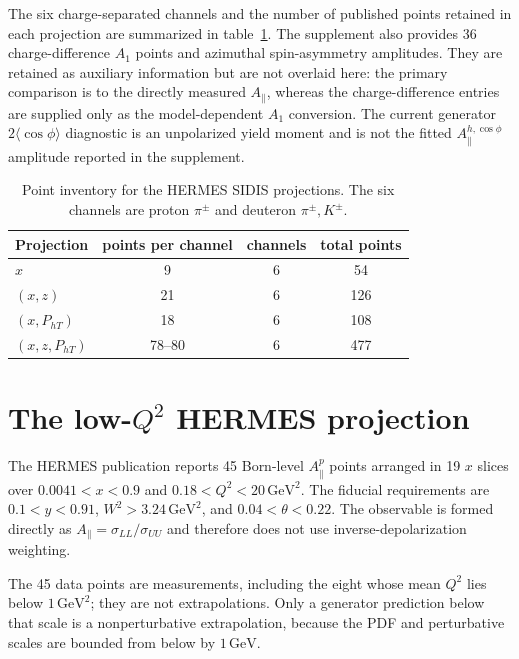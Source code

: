\documentclass[11pt,a4paper]{article}
\newcommand{\ap}{A_{\parallel}}
\newcommand{\suu}{\sigma_{UU}}
\newcommand{\sll}{\sigma_{LL}}
\newcommand{\GeV}{\ensuremath{\,\mathrm{GeV}}}
\begin{document}
The six charge-separated channels and the number of published points retained
in each projection are summarized in table~\ref{tab:sidis-projections}.  The
supplement also provides 36 charge-difference $A_1$ points and azimuthal
spin-asymmetry amplitudes.  They are retained as auxiliary information but
are not overlaid here: the primary comparison is to the directly measured
$A_\parallel$, whereas the charge-difference entries are supplied only as
the model-dependent $A_1$ conversion.  The current generator
$2\langle\cos\phi\rangle$ diagnostic is an unpolarized yield moment and is
not the fitted $A_\parallel^{h,\cos\phi}$ amplitude reported in the
supplement.

\begin{table}[h]
  \centering
  \caption{Point inventory for the HERMES SIDIS projections.  The six
  channels are proton $\pi^\pm$ and deuteron $\pi^\pm,K^\pm$.}
  \label{tab:sidis-projections}
  \small
  \begin{tabular}{@{}lccc@{}}
    \toprule
    Projection & points per channel & channels & total points \\
    \midrule
    $x$ & 9 & 6 & 54 \\
    $(x,z)$ & 21 & 6 & 126 \\
    $(x,P_{hT})$ & 18 & 6 & 108 \\
    $(x,z,P_{hT})$ & 78--80 & 6 & 477 \\
    \bottomrule
  \end{tabular}
\end{table}

\clearpage
\section{The low-\texorpdfstring{$Q^2$}{Q2} HERMES projection}
\label{app:lowq2}

The HERMES publication reports 45 Born-level $A_\parallel^p$ points arranged
in 19 $x$ slices over
$0.0041<x<0.9$ and $0.18<Q^2<20\,\mathrm{GeV}^2$.  The fiducial
requirements are $0.1<y<0.91$, $W^2>3.24\,\mathrm{GeV}^2$, and
$0.04<\theta<0.22$.  The observable is formed directly as
$\ap=\sll/\suu$ and therefore does not use inverse-depolarization weighting.

The 45 data points are measurements, including the eight whose mean
$Q^2$ lies below $1\,\mathrm{GeV}^2$; they are not extrapolations.  Only a
generator prediction below that scale is a nonperturbative extrapolation,
because the PDF and perturbative scales are bounded from below by $1\GeV$.
\end{document}
